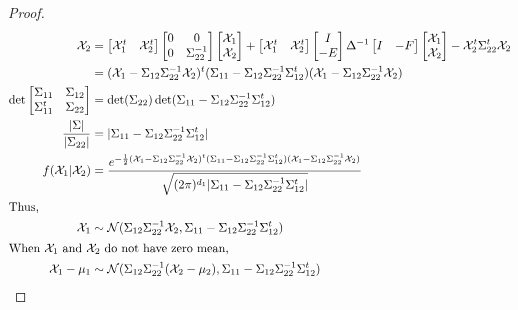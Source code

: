 \documentclass[letter, 12pt]{article}
\begin{document}
\begin{enumerate}[wide = 0pt, label = \textbf{Problem \arabic*:}]
\begin{proof}
\begin{align*}
				\mathcal{X}_2
				&=
				\begin{bmatrix} \mathcal{X}_1^t & \mathcal{X}_2^t \end{bmatrix} \begin{bmatrix}
				0 & 0 \\
				0 &\Sigma_{22}^{-1}
				\end{bmatrix} 
				\begin{bmatrix} \mathcal{X}_1 \\ \mathcal{X}_2 \end{bmatrix}
				+
				\begin{bmatrix} \mathcal{X}_1^t & \mathcal{X}_2^t \end{bmatrix} \begin{bmatrix}
				I \\ -E
				\end{bmatrix}
				\Delta^{-1}
				\begin{bmatrix}
				I & -F
				\end{bmatrix} 
				\begin{bmatrix} \mathcal{X}_1 \\ \mathcal{X}_2 \end{bmatrix}
				- 
				\mathcal{X}_2^t \Sigma_{22}^t 
				\mathcal{X}_2 \\
				&=
				(\mathcal{X}_1 - \Sigma_{12} \Sigma_{22}^{-1} \mathcal{X}_2)^t(\Sigma_{11} - \Sigma_{12} \Sigma_{22}^{-1} \Sigma_{12}^t)(\mathcal{X}_1 - \Sigma_{12} \Sigma_{22}^{-1} \mathcal{X}_2) \\
				\det
				\begin{bmatrix}
				\Sigma_{11} & \Sigma_{12} \\
				\Sigma_{11}^t &\Sigma_{22}
				\end{bmatrix}
				&=
				\det(\Sigma_{22})\det(\Sigma_{11} - \Sigma_{12}\Sigma_{22}^{-1}\Sigma_{12}^t) \\
				\frac{|\Sigma|}{|\Sigma_{22}|} &= |\Sigma_{11} - \Sigma_{12}\Sigma_{22}^{-1}\Sigma_{12}^t| \\
				f(\mathcal{X}_1 | \mathcal{X}_2) 
				&=
				\frac{e^{-\frac{1}{2}(\mathcal{X}_1 - \Sigma_{12} \Sigma_{22}^{-1} \mathcal{X}_2)^t(\Sigma_{11} - \Sigma_{12} \Sigma_{22}^{-1} \Sigma_{12}^t)(\mathcal{X}_1 - \Sigma_{12} \Sigma_{22}^{-1} \mathcal{X}_2)}}{\sqrt{(2 \pi)^{d_1}|\Sigma_{11} - \Sigma_{12}\Sigma_{22}^{-1}\Sigma_{12}^t|}} \\
				\shortintertext{Thus,}
				\mathcal{X}_1 &\sim \mathcal{N}(\Sigma_{12}\Sigma_{22}^{-1}\mathcal{X}_2, \Sigma_{11} - \Sigma_{12}\Sigma_{22}^{-1}\Sigma_{12}^t) \\
				\shortintertext{When $ \mathcal{X}_1 $ and $ \mathcal{X}_2 $ do not have zero mean,}
				\mathcal{X}_1 - \mu_1 &\sim \mathcal{N}(\Sigma_{12}\Sigma_{22}^{-1}(\mathcal{X}_2 - \mu_2), \Sigma_{11} - \Sigma_{12}\Sigma_{22}^{-1}\Sigma_{12}^t) \\
			\end{align*}
		\end{proof}
		

\end{enumerate}
\end{document}
